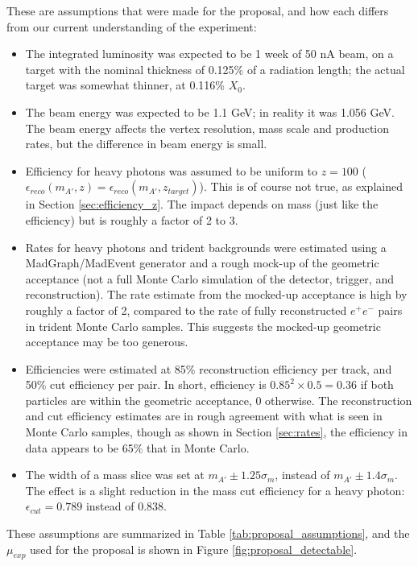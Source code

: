 These are assumptions that were made for the proposal, and how each differs from our current understanding of the experiment:
\begin{itemize}
\item The integrated luminosity was expected to be 1 week of 50 nA beam, on a target with the nominal thickness of 0.125\% of a radiation length; the actual target was somewhat thinner, at 0.116\% $X_0$.
\item The beam energy was expected to be 1.1 GeV; in reality it was 1.056 GeV. The beam energy affects the vertex resolution, mass scale and production rates, but the difference in beam energy is small.
\item Efficiency for heavy photons was assumed to be uniform to $z=100$ ($\epsilon_{reco}(m_{A'},z) = \epsilon_{reco}(m_{A'},z_{target})$).
This is of course not true, as explained in Section \ref{sec:efficiency_z}.
The impact depends on mass (just like the efficiency) but is roughly a factor of 2 to 3.
\item Rates for heavy photons and trident backgrounds were estimated using a MadGraph/MadEvent generator and a rough mock-up of the geometric acceptance (not a full Monte Carlo simulation of the detector, trigger, and reconstruction).
The rate estimate from the mocked-up acceptance is high by roughly a factor of 2, compared to the rate of fully reconstructed $e^+e^-$ pairs in trident Monte Carlo samples.
This suggests the mocked-up geometric acceptance may be too generous.
\item Efficiencies were estimated at 85\% reconstruction efficiency per track, and 50\% cut efficiency per pair.
In short, efficiency is $0.85^2\times 0.5=0.36$ if both particles are within the geometric acceptance, 0 otherwise.
The reconstruction and cut efficiency estimates are in rough agreement with what is seen in Monte Carlo samples, though as shown in Section \ref{sec:rates}, the efficiency in data appears to be 65\% that in Monte Carlo.
\item The width of a mass slice was set at $m_{A'}\pm 1.25\sigma_m$, instead of $m_{A'}\pm 1.4\sigma_m$. The effect is a slight reduction in the mass cut efficiency for a heavy photon: $\epsilon_{cut}=0.789$ instead of 0.838.
\end{itemize}

These assumptions are summarized in Table \ref{tab:proposal_assumptions}, and the $\mu_{exp}$ used for the proposal is shown in Figure \ref{fig:proposal_detectable}.

